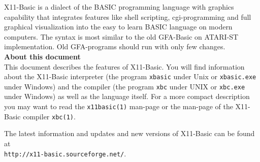 X11-Basic is a dialect of the BASIC programming language with graphics
capability that integrates features like shell scripting, cgi-programming and
full graphical visualization into the easy to learn BASIC language on modern
computers. The syntax is most similar to the old GFA-Basic on ATARI-ST
implementation. Old GFA-programs should run with only few changes.\\[4ex]

{\bf About this document}\\[2ex] This document	describes the features of
X11-Basic. You will find information about the X11-Basic interpreter (the 
program \verb|xbasic| under Unix or \verb|xbasic.exe| under Windows) and the
compiler (the program \verb|xbc| under UNIX or \verb|xbc.exe| under Windows) as
well as the language itself. For a more compact description you may  want to
read the \verb|x11basic(1)| man-page or the man-page of the X11-Basic compiler
\verb|xbc(1)|.

The latest information and updates and new versions of X11-Basic can be found
at\\ \verb|http://x11-basic.sourceforge.net/|.

